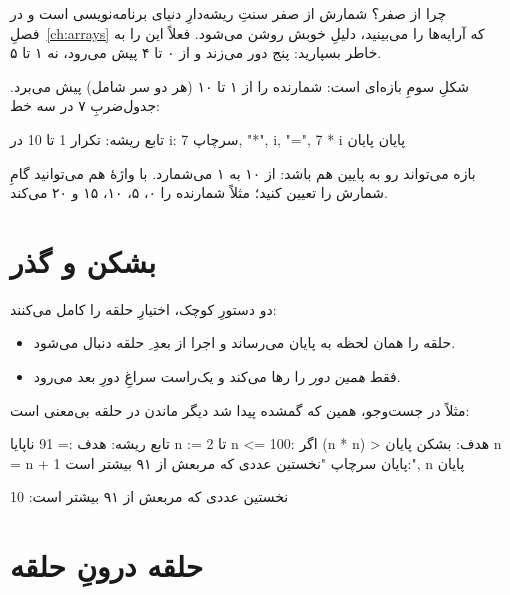 \begin{note}
چرا از صفر؟ شمارش از صفر سنتِ ریشه‌دارِ دنیای برنامه‌نویسی است و در فصلِ~\ref{ch:arrays} که آرایه‌ها را می‌بینید، دلیلِ خوبش روشن می‌شود. فعلاً این
را به خاطر بسپارید:  پنج دور می‌زند و  از ۰ تا ۴
پیش می‌رود، نه ۱ تا ۵.
\end{note}

شکلِ سومِ  بازه‌ای است:  شمارنده را
از ۱ تا ۱۰ (هر دو سر شامل) پیش می‌برد. جدول‌ضربِ ۷ در سه خط:

\begin{salamfa}
تابع ریشه:
    تکرار 1 تا 10 در i:
        سرچاپ 7, "*", i, "=", 7 * i
    پایان
پایان
\end{salamfa}

بازه می‌تواند رو به پایین هم باشد:  از ۱۰ به ۱
می‌شمارد. با واژهٔ  هم می‌توانید گامِ شمارش را تعیین کنید؛ مثلاً
 شمارنده را ۰، ۵، ۱۰، ۱۵ و ۲۰ می‌کند.

\section{بشکن و گذر}

دو دستورِ کوچک، اختیارِ حلقه را کامل می‌کنند:

\begin{itemize}
  \item {} حلقه را همان لحظه به پایان می‌رساند و اجرا از بعدِ
        ِ حلقه دنبال می‌شود.
  \item {} فقط \emph{همین دور} را رها می‌کند و یک‌راست سراغِ دورِ
        بعد می‌رود.
\end{itemize}

مثلاً در جست‌وجو، همین که گمشده پیدا شد دیگر ماندن در حلقه بی‌معنی است:

\begin{salamfa}
تابع ریشه:
    هدف := 91
    ناپایا n := 2
    تا n <= 100:
        اگر (n * n) > هدف:
            بشکن
        پایان
        n = n + 1
    پایان
    سرچاپ "نخستین عددی که مربعش از ۹۱ بیشتر است:", n
پایان
\end{salamfa}

\begin{progoutfa}
نخستین عددی که مربعش از ۹۱ بیشتر است: 10
\end{progoutfa}

\section{حلقه درونِ حلقه}

